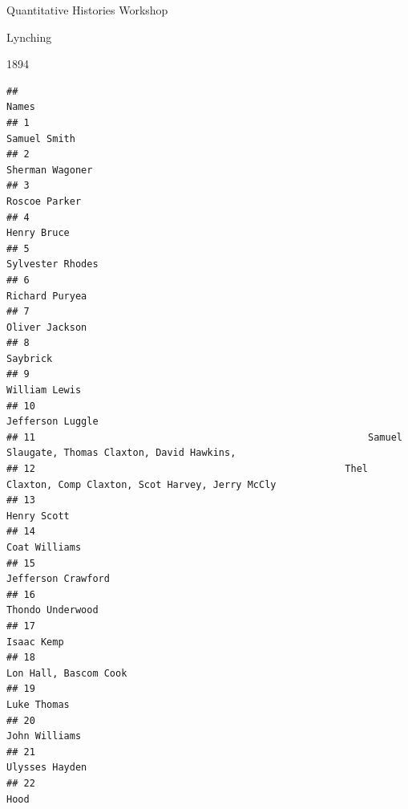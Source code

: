 \documentclass[
  ignorenonframetext,
]{beamer}
\begin{document}
\begin{frame}[fragile]{Quantitative Histories Workshop}
\begin{block}{Lynching}
\begin{block}{1894}
\begin{verbatim}
##                                                                                                        Names
## 1                                                                                               Samuel Smith
## 2                                                                                            Sherman Wagoner
## 3                                                                                              Roscoe Parker
## 4                                                                                                Henry Bruce
## 5                                                                                           Sylvester Rhodes
## 6                                                                                             Richard Puryea
## 7                                                                                             Oliver Jackson
## 8                                                                                                   Saybrick
## 9                                                                                              William Lewis
## 10                                                                                          Jefferson Luggle
## 11                                                          Samuel Slaugate, Thomas Claxton, David Hawkins, 
## 12                                                      Thel Claxton, Comp Claxton, Scot Harvey, Jerry McCly
## 13                                                                                               Henry Scott
## 14                                                                                             Coat Williams
## 15                                                                                        Jefferson Crawford
## 16                                                                                          Thondo Underwood
## 17                                                                                                Isaac Kemp
## 18                                                                                     Lon Hall, Bascom Cook
## 19                                                                                               Luke Thomas
## 20                                                                                             John Williams
## 21                                                                                            Ulysses Hayden
## 22                                                                                                      Hood

\end{verbatim}
\end{block}
\end{block}
\end{frame}
\end{document}
